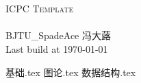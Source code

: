 ﻿\documentclass[12pt,a4paper]{article}
\begin{document}
    \pagestyle{fancy}
    \lhead{} 
    \chead{} 
    \cfoot{}
    \rfoot{\bfseries\thepage} 
    \renewcommand{\headrulewidth}{0.4pt} 
    \renewcommand{\footrulewidth}{0.4pt}
    \begin{titlepage}

	\pagestyle{empty}
	
        \begin{center}
        ~\\[160pt]
        
        ~\\[8pt]
        \fontsize{48pt}{\baselineskip}\selectfont  \textsc{ICPC Template}\\[8pt]
        ~\\[340pt]

        \huge BJTU\_SpadeAce 冯大蕗\\[8pt]
        \Large Last build at \today
        \end{center}
    \end{titlepage}

    \restoregeometry
	\tableofcontents
    \clearpage
	
     {基础.tex}
     {图论.tex}
	 {数据结构.tex}
		
	
	\clearpage
	
\end{document}
